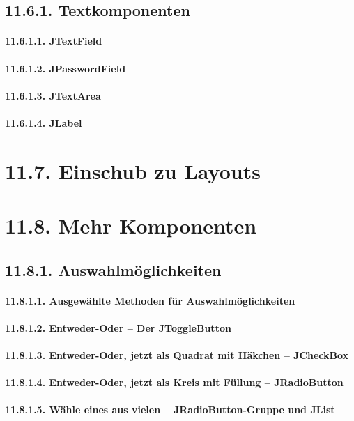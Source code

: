 \subsection{11.6.1.	Textkomponenten}
\paragraph{11.6.1.1.	JTextField}
\paragraph{11.6.1.2.	JPasswordField}
\paragraph{11.6.1.3.	JTextArea}
\paragraph{11.6.1.4.	JLabel}
\section{11.7.	Einschub zu Layouts}
\section{11.8.	Mehr Komponenten}
\subsection{11.8.1.	Auswahlmöglichkeiten}
\paragraph{11.8.1.1.	Ausgewählte Methoden für Auswahlmöglichkeiten}
\paragraph{11.8.1.2.	Entweder-Oder – Der JToggleButton}
\paragraph{11.8.1.3.	Entweder-Oder, jetzt als Quadrat mit Häkchen – JCheckBox}
\paragraph{11.8.1.4.	Entweder-Oder, jetzt als Kreis mit Füllung – JRadioButton}
\paragraph{11.8.1.5.	Wähle eines aus vielen – JRadioButton-Gruppe und JList}
